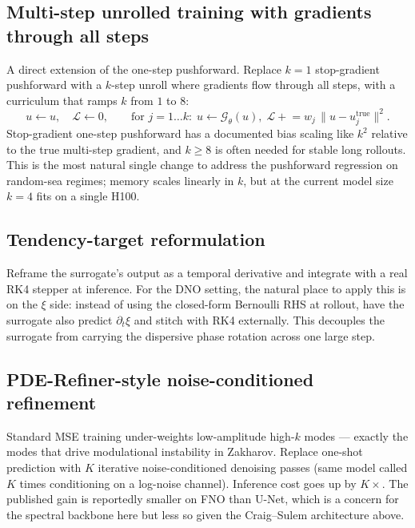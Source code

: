\documentclass[11pt,letterpaper]{article}
\newcommand{\Gop}{\mathcal{G}}
\begin{document}
\subsection{Multi-step unrolled training with gradients through all steps}
A direct extension of the one-step pushforward. Replace $k=1$
stop-gradient pushforward with a $k$-step unroll where gradients flow
through all steps, with a curriculum that ramps $k$ from $1$ to $8$:
\[
  u \leftarrow u, \quad \mathcal{L} \leftarrow 0,
  \qquad
  \text{for } j=1\dots k:\;
  u \leftarrow \Gop_\theta(u),\;
  \mathcal{L} \mathrel{+}= w_{j}\,\big\|u - u_{j}^{\mathrm{true}}\big\|^{2}.
\]
Stop-gradient one-step pushforward has a documented bias scaling like
$k^{2}$ relative to the true multi-step gradient, and $k\geq 8$ is often
needed for stable long rollouts. This is the most natural single change
to address the pushforward regression on random-sea regimes; memory
scales linearly in $k$, but at the current model size $k=4$ fits on a
single H100.

\subsection{Tendency-target reformulation}
Reframe the surrogate's output as a temporal derivative and integrate
with a real RK4 stepper at inference. For the DNO setting, the natural
place to apply this is on the $\xi$ side: instead of using the
closed-form Bernoulli RHS at rollout, have the surrogate also predict
$\partial_{t}\xi$ and stitch with RK4 externally. This decouples the
surrogate from carrying the dispersive phase rotation across one large
step.

\subsection{PDE-Refiner-style noise-conditioned refinement}
Standard MSE training under-weights low-amplitude high-$k$ modes ---
exactly the modes that drive modulational instability in Zakharov.
Replace one-shot prediction with $K$ iterative noise-conditioned
denoising passes (same model called $K$ times conditioning on a
log-noise channel). Inference cost goes up by $K\times$. The published
gain is reportedly smaller on FNO than U-Net, which is a concern for the
spectral backbone here but less so given the Craig--Sulem architecture
above.
\end{document}
